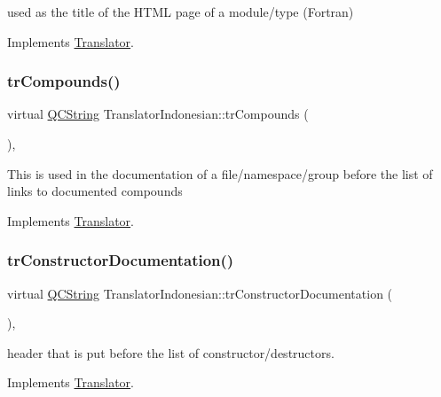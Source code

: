 used as the title of the H\+T\+ML page of a module/type (Fortran) 

Implements \mbox{\hyperlink{class_translator}{Translator}}.

\mbox{\label{class_translator_indonesian_a2322f998123a9a293465631ef45b6a67}} 
\subsubsection{\texorpdfstring{trCompounds()}{trCompounds()}}
{\footnotesize\ttfamily virtual \mbox{\hyperlink{class_q_c_string}{Q\+C\+String}} Translator\+Indonesian\+::tr\+Compounds (\begin{DoxyParamCaption}{ }\end{DoxyParamCaption})\hspace{0.3cm}{\ttfamily [inline]}, {\ttfamily [virtual]}}

This is used in the documentation of a file/namespace/group before the list of links to documented compounds 

Implements \mbox{\hyperlink{class_translator}{Translator}}.

\mbox{\label{class_translator_indonesian_a8eb6e9779b4d65108a6ce51d47404981}} 
\subsubsection{\texorpdfstring{trConstructorDocumentation()}{trConstructorDocumentation()}}
{\footnotesize\ttfamily virtual \mbox{\hyperlink{class_q_c_string}{Q\+C\+String}} Translator\+Indonesian\+::tr\+Constructor\+Documentation (\begin{DoxyParamCaption}{ }\end{DoxyParamCaption})\hspace{0.3cm}{\ttfamily [inline]}, {\ttfamily [virtual]}}

header that is put before the list of constructor/destructors. 

Implements \mbox{\hyperlink{class_translator}{Translator}}.

